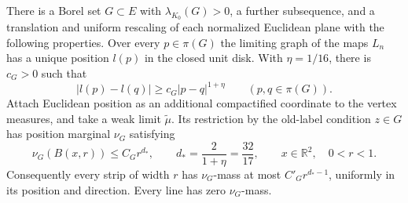 \begin{proposition}\label{prop:spatial-limit}
There is a Borel set $G\subset E$ with $\lambda_{K_0}(G)>0$, a further
subsequence, and a translation and uniform rescaling of each normalized
Euclidean plane with the following properties.  Over every
$p\in\pi(G)$ the limiting graph of the maps $L_n$ has a unique position
$l(p)$ in the closed unit disk.  With $\eta=1/16$, there is $c_G>0$ such
that
\begin{equation}
 |l(p)-l(q)|\ge c_G|p-q|^{1+\eta}
 \qquad(p,q\in\pi(G)).
 \label{eq:inverse-holder}
\end{equation}
Attach Euclidean position as an additional compactified coordinate to the
vertex measures, and take a weak limit $\widetilde\mu$.  Its restriction
by the old-label condition $z\in G$ has position marginal $\nu_G$
satisfying
\begin{equation}
 \nu_G(B(x,r))\le C_G r^{d_*},
 \qquad d_*=\frac{2}{1+\eta}=\frac{32}{17},
 \qquad x\in\mathbb R^2,\quad 0<r<1.
 \label{eq:disk-bound}
\end{equation}
Consequently every strip of width $r$ has $\nu_G$-mass at most
$C'_G r^{d_*-1}$, uniformly in its position and direction.  Every line
has zero $\nu_G$-mass.
\end{proposition}

